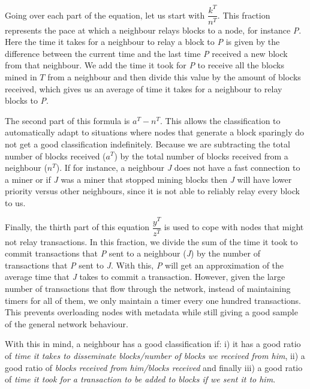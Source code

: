 Going over each part of the equation, let us start with $\dfrac{k^{T}}{n^{T}}$. This fraction represents the pace at which a neighbour relays blocks to a node, for instance \textsl{P}.
Here the time it takes for a neighbour to relay a block to \textsl{P} is given by the difference between the current time and the last time \textsl{P} received a new block from that neighbour. We add the time it took for \textsl{P} to receive all the blocks mined in $T$ from a neighbour and then divide this value by the amount of blocks received, which gives us an average of time it takes for a neighbour to relay blocks to \textsl{P}.

The second part of this formula is $a^{T} - n^{T}$. This allows the classification to automatically adapt to situations where nodes that generate a block sparingly do not get a good classification indefinitely. Because we are subtracting the total number of blocks received ($a^{T}$) by the total number of blocks received from a neighbour (${n^{T}}$). If for instance, a neighbour \textsl{J} does not have a fast connection to a miner or if \textsl{J} was a miner that stopped mining blocks then \textsl{J} will have lower priority versus other neighbours, since it is not able to reliably relay every block to us.

Finally, the thirth part of this equation $\dfrac{y^{T}}{z^{T}}$ is used to cope with nodes that might not relay transactions. In this fraction, we divide the sum of the time it took to commit transactions that \textsl{P} sent to a neighbour (\textsl{J}) by the number of transactions that \textsl{P} sent to \textsl{J}. With this, \textsl{P} will get an approximation of the average time that \textsl{J} takes to commit a transaction. However, given the large number of transactions that flow through the network, instead of maintaining timers for all of them, we only maintain a timer every one hundred transactions. This prevents overloading nodes with metadata while still giving a good sample of the general network behaviour.

With this in mind, a neighbour has a good classification if: i) it has a good ratio of \textsl{time it takes to disseminate blocks/number of blocks we received from him}, ii) a good ratio of \textsl{blocks received from him/blocks received} and finally iii) a good ratio of \textsl{time it took for a transaction to be added to blocks if we sent it to him}.

